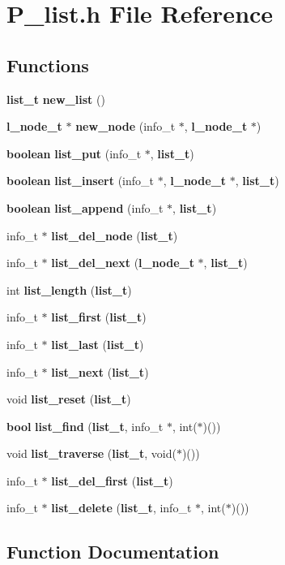 \section{P\_\-list.h File Reference}
\label{P__list_8h}
\subsection*{Functions}
\begin{CompactItemize}
\item 
{\bf list\_\-t} {\bf new\_\-list} ()
\item 
{\bf l\_\-node\_\-t} $\ast$ {\bf new\_\-node} (info\_\-t $\ast$, {\bf l\_\-node\_\-t} $\ast$)
\item 
{\bf boolean} {\bf list\_\-put} (info\_\-t $\ast$, {\bf list\_\-t})
\item 
{\bf boolean} {\bf list\_\-insert} (info\_\-t $\ast$, {\bf l\_\-node\_\-t} $\ast$, {\bf list\_\-t})
\item 
{\bf boolean} {\bf list\_\-append} (info\_\-t $\ast$, {\bf list\_\-t})
\item 
info\_\-t $\ast$ {\bf list\_\-del\_\-node} ({\bf list\_\-t})
\item 
info\_\-t $\ast$ {\bf list\_\-del\_\-next} ({\bf l\_\-node\_\-t} $\ast$, {\bf list\_\-t})
\item 
int {\bf list\_\-length} ({\bf list\_\-t})
\item 
info\_\-t $\ast$ {\bf list\_\-first} ({\bf list\_\-t})
\item 
info\_\-t $\ast$ {\bf list\_\-last} ({\bf list\_\-t})
\item 
info\_\-t $\ast$ {\bf list\_\-next} ({\bf list\_\-t})
\item 
void {\bf list\_\-reset} ({\bf list\_\-t})
\item 
{\bf bool} {\bf list\_\-find} ({\bf list\_\-t}, info\_\-t $\ast$, int($\ast$)())
\item 
void {\bf list\_\-traverse} ({\bf list\_\-t}, void($\ast$)())
\item 
info\_\-t $\ast$ {\bf list\_\-del\_\-first} ({\bf list\_\-t})
\item 
info\_\-t $\ast$ {\bf list\_\-delete} ({\bf list\_\-t}, info\_\-t $\ast$, int($\ast$)())
\end{CompactItemize}


\subsection{Function Documentation}
